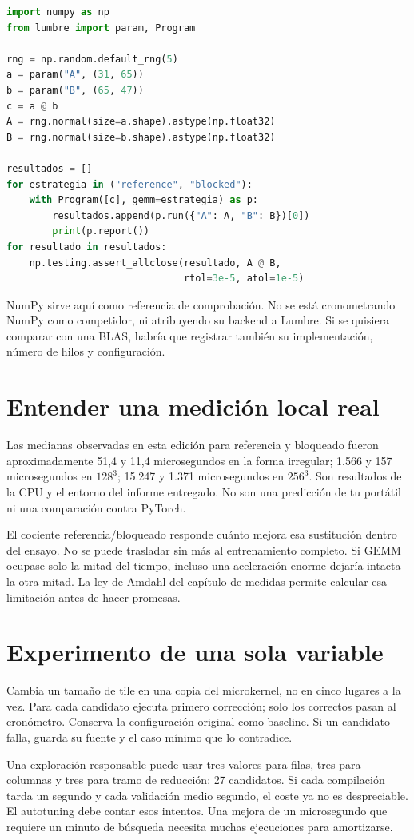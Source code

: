 \documentclass[12pt,a4paper,oneside]{report}
\begin{document}
\begin{lstlisting}[language=Python]
import numpy as np
from lumbre import param, Program

rng = np.random.default_rng(5)
a = param("A", (31, 65))
b = param("B", (65, 47))
c = a @ b
A = rng.normal(size=a.shape).astype(np.float32)
B = rng.normal(size=b.shape).astype(np.float32)

resultados = []
for estrategia in ("reference", "blocked"):
    with Program([c], gemm=estrategia) as p:
        resultados.append(p.run({"A": A, "B": B})[0])
        print(p.report())
for resultado in resultados:
    np.testing.assert_allclose(resultado, A @ B,
                               rtol=3e-5, atol=1e-5)
\end{lstlisting}
NumPy sirve aquí como referencia de comprobación. No se está cronometrando NumPy como competidor, ni atribuyendo su backend a Lumbre. Si se quisiera comparar con una BLAS, habría que registrar también su implementación, número de hilos y configuración.

\section{Entender una medición local real}
Las medianas observadas en esta edición para referencia y bloqueado fueron aproximadamente 51,4 y 11,4 microsegundos en la forma irregular; 1.566 y 157 microsegundos en $128^3$; 15.247 y 1.371 microsegundos en $256^3$. Son resultados de la CPU y el entorno del informe entregado. No son una predicción de tu portátil ni una comparación contra PyTorch.

El cociente referencia/bloqueado responde cuánto mejora esa sustitución dentro del ensayo. No se puede trasladar sin más al entrenamiento completo. Si GEMM ocupase solo la mitad del tiempo, incluso una aceleración enorme dejaría intacta la otra mitad. La ley de Amdahl del capítulo de medidas permite calcular esa limitación antes de hacer promesas.

\section{Experimento de una sola variable}
Cambia un tamaño de tile en una copia del microkernel, no en cinco lugares a la vez. Para cada candidato ejecuta primero corrección; solo los correctos pasan al cronómetro. Conserva la configuración original como baseline. Si un candidato falla, guarda su fuente y el caso mínimo que lo contradice.

Una exploración responsable puede usar tres valores para filas, tres para columnas y tres para tramo de reducción: 27 candidatos. Si cada compilación tarda un segundo y cada validación medio segundo, el coste ya no es despreciable. El autotuning debe contar esos intentos. Una mejora de un microsegundo que requiere un minuto de búsqueda necesita muchas ejecuciones para amortizarse.
\end{document}
